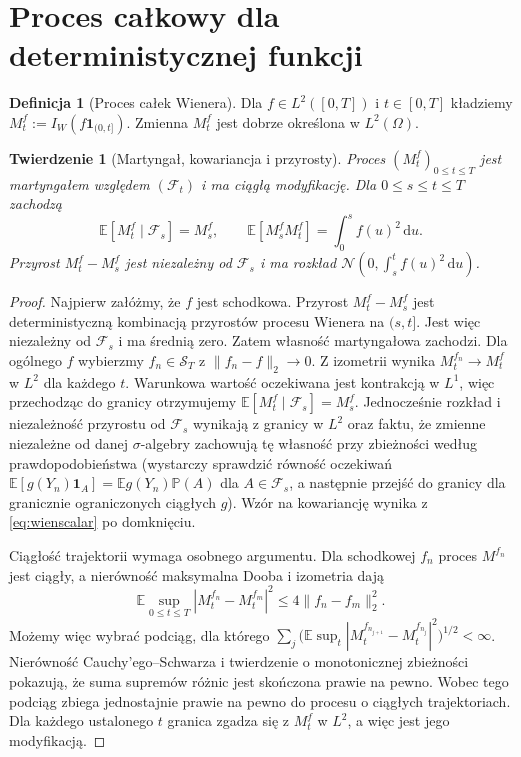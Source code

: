 \documentclass[11pt,a4paper,oneside]{report}
\numberwithin{equation}{chapter}
\theoremstyle{plain}
\newtheorem{twierdzenie}{Twierdzenie}[chapter]
\theoremstyle{definition}
\newtheorem{definicja}{Definicja}[chapter]
\theoremstyle{remark}
\newcommand{\Prob}{\mathbb{P}}
\newcommand{\E}{\mathbb{E}}
\newcommand{\calF}{\mathcal{F}}
\newcommand{\calS}{\mathcal{S}}
\newcommand{\ind}[1]{\mathbf{1}_{#1}}
\newcommand{\dd}{\mathrm{d}}
\newcommand{\norm}[1]{\lVert #1\rVert}
\newcommand{\Normal}{\mathcal{N}}
\begin{document}
\section{Proces całkowy dla deterministycznej funkcji}
\begin{definicja}[Proces całek Wienera]
Dla $f\in L^2([0,T])$ i $t\in[0,T]$ kładziemy
$M_t^f:=I_W(f\ind{(0,t]})$.
Zmienna $M_t^f$ jest dobrze określona w $L^2(\Omega)$.
\end{definicja}
\begin{twierdzenie}[Martyngał, kowariancja i przyrosty]
Proces $(M_t^f)_{0\le t\le T}$ jest martyngałem względem
$(\calF_t)$ i ma ciągłą modyfikację. Dla $0\le s\le t\le T$
zachodzą
\[
\E[M_t^f\mid\calF_s]=M_s^f,\qquad
\E[M_s^fM_t^f]=\int_0^sf(u)^2\,\dd u.
\tag{1.5}
\]
Przyrost $M_t^f-M_s^f$ jest niezależny od $\calF_s$
i ma rozkład $\Normal(0,\int_s^tf(u)^2\,\dd u)$.
\end{twierdzenie}
\begin{proof}
Najpierw załóżmy, że $f$ jest schodkowa. Przyrost
$M_t^f-M_s^f$ jest deterministyczną kombinacją przyrostów
procesu Wienera na $(s,t]$. Jest więc niezależny od $\calF_s$
i ma średnią zero. Zatem własność martyngałowa zachodzi.
Dla ogólnego $f$ wybierzmy $f_n\in\calS_T$ z
$\norm{f_n-f}_2\to0$. Z izometrii wynika
$M_t^{f_n}\to M_t^f$ w $L^2$ dla każdego $t$.
Warunkowa wartość oczekiwana jest kontrakcją w $L^1$,
więc przechodząc do granicy otrzymujemy
$\E[M_t^f\mid\calF_s]=M_s^f$. Jednocześnie rozkład
i niezależność przyrostu od $\calF_s$ wynikają z granicy
w $L^2$ oraz faktu, że zmienne niezależne od danej
$\sigma$-algebry zachowują tę własność przy zbieżności
według prawdopodobieństwa (wystarczy sprawdzić równość
oczekiwań $\E[g(Y_n)\ind A]=\E g(Y_n)\Prob(A)$ dla
$A\in\calF_s$, a następnie przejść do granicy dla
granicznie ograniczonych ciągłych $g$). Wzór na kowariancję
wynika z \eqref{eq:wienscalar} po domknięciu.

Ciągłość trajektorii wymaga osobnego argumentu. Dla
schodkowej $f_n$ proces $M^{f_n}$ jest ciągły, a
nierówność maksymalna Dooba i izometria dają
\[
\E\sup_{0\le t\le T}|M_t^{f_n}-M_t^{f_m}|^2
\le4\norm{f_n-f_m}_2^2.
\]
Możemy więc wybrać podciąg, dla którego
$\sum_j\big(\E\sup_t|M_t^{f_{n_{j+1}}}-M_t^{f_{n_j}}|^2\big)^{1/2}<\infty$.
Nierówność Cauchy'ego--Schwarza i twierdzenie o monotonicznej
zbieżności pokazują, że suma supremów różnic jest skończona
prawie na pewno. Wobec tego podciąg zbiega jednostajnie
prawie na pewno do procesu o ciągłych trajektoriach.
Dla każdego ustalonego $t$ granica zgadza się z $M_t^f$
w $L^2$, a więc jest jego modyfikacją.
\end{proof}
\end{document}

